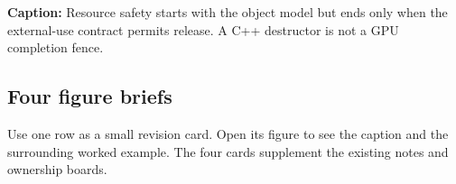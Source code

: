 \hypertarget{appendix-960160274237-one-story-from-source-text-to-responsibly-released-resource}{}


\textbf{Caption:} Resource safety starts with the object model but ends only when the external-use contract permits release. A C++ destructor is not a GPU completion fence.

\subsection{Four figure briefs}\label{appendix-960160274237-four-figure-briefs}

\hypertarget{appendix-960160274237-four-figure-briefs}{}

Use one row as a small revision card. Open its figure to see the caption and the surrounding worked example. The four cards supplement the existing notes and ownership boards.

